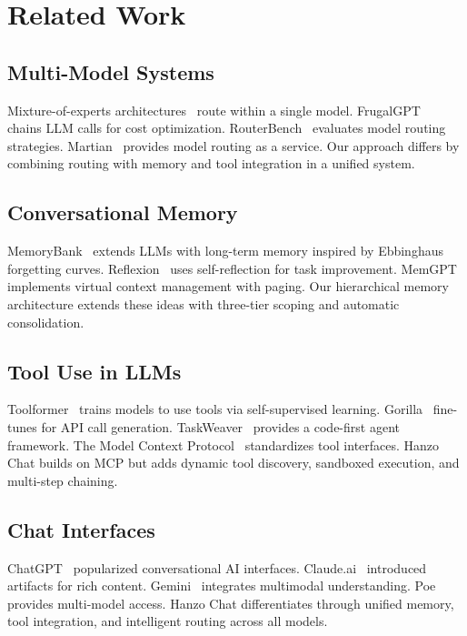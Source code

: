 \section{Related Work}

\label{sec:related}

\subsection{Multi-Model Systems}

Mixture-of-experts architectures~\cite{shazeer2017outrageously,fedus2022switch} route within a single model. FrugalGPT~\cite{chen2023frugalgpt} chains LLM calls for cost optimization. RouterBench~\cite{hu2024routerbench} evaluates model routing strategies. Martian~\cite{martian2024} provides model routing as a service. Our approach differs by combining routing with memory and tool integration in a unified system.

\subsection{Conversational Memory}

MemoryBank~\cite{zhong2024memorybank} extends LLMs with long-term memory inspired by Ebbinghaus forgetting curves. Reflexion~\cite{shinn2023reflexion} uses self-reflection for task improvement. MemGPT~\cite{packer2023memgpt} implements virtual context management with paging. Our hierarchical memory architecture extends these ideas with three-tier scoping and automatic consolidation.

\subsection{Tool Use in LLMs}

Toolformer~\cite{schick2023toolformer} trains models to use tools via self-supervised learning. Gorilla~\cite{patil2023gorilla} fine-tunes for API call generation. TaskWeaver~\cite{qin2024taskweaver} provides a code-first agent framework. The Model Context Protocol~\cite{anthropic2024mcp} standardizes tool interfaces. Hanzo Chat builds on MCP but adds dynamic tool discovery, sandboxed execution, and multi-step chaining.

\subsection{Chat Interfaces}

ChatGPT~\cite{openai2022chatgpt} popularized conversational AI interfaces. Claude.ai~\cite{anthropic2024claude} introduced artifacts for rich content. Gemini~\cite{google2024gemini} integrates multimodal understanding. Poe~\cite{quora2023poe} provides multi-model access. Hanzo Chat differentiates through unified memory, tool integration, and intelligent routing across all models.

